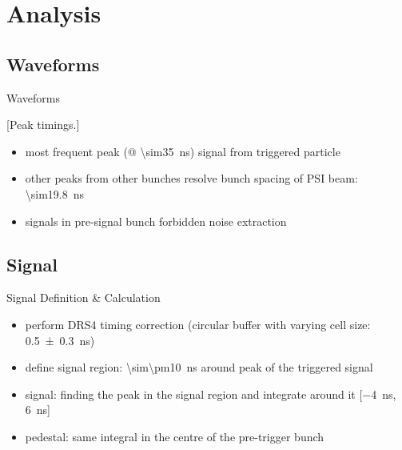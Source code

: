 \section{Analysis}
\subsection{Waveforms}
\begin{frame}{Waveforms}

	\vspace*{-20pt}
	\vspace*{-20pt}
	[Peak timings.]\vspace*{-10pt}

	\begin{itemize}\itemfill
		\item most frequent peak (@ \SI{\sim35}{ns}) \ra signal from triggered particle
		\item other peaks from other bunches \ra resolve bunch spacing of PSI beam: \SI{\sim19.8}{ns}
		\item signals in pre-signal bunch forbidden \ra noise extraction
	\end{itemize}
	
\end{frame}
\subsection{Signal}
\begin{frame}{Signal Definition \& Calculation}
 
	\vspace*{-10pt}
	
	\begin{itemize}\itemfill
		\item perform DRS4 timing correction (circular buffer with varying cell size: \SI{.5\pm.3}{\nano\second})
		\item define signal region: \SI{\sim\pm10}{\nano\second} around peak of the triggered signal 
		\item signal: finding the peak in the signal region and integrate around it [\SI{-4}{\nano\second}, \SI{6}{\nano\second}]
		\item pedestal: same integral in the centre of the pre-trigger bunch 
	\end{itemize}
 
\end{frame}
